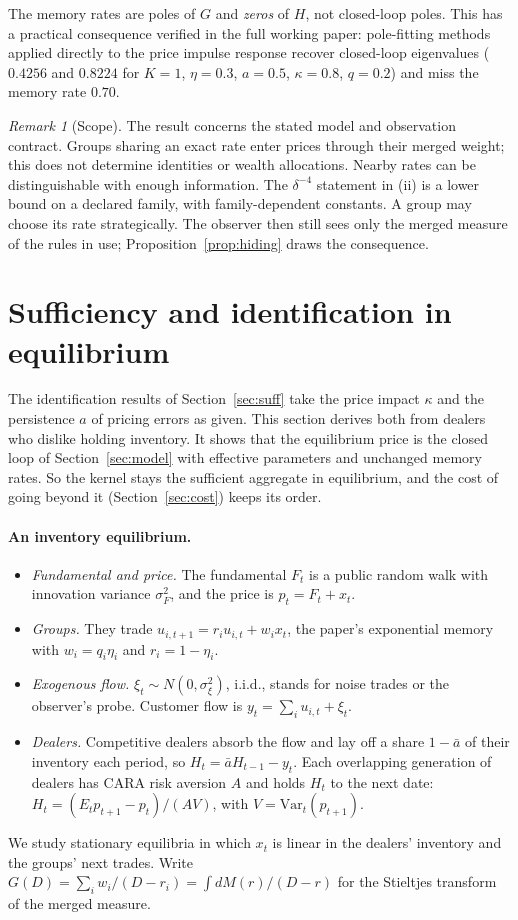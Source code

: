 \documentclass[12pt]{article}
\theoremstyle{definition}
\theoremstyle{remark}
\newtheorem{remark}[theorem]{Remark}
\begin{document}
The memory rates are poles of $G$ and \emph{zeros} of $H$, not closed-loop poles. This has a practical consequence verified in the full working paper: pole-fitting methods applied directly to the price impulse response recover closed-loop eigenvalues ($0.4256$ and $0.8224$ for $K=1$, $\eta=0.3$, $a=0.5$, $\kappa=0.8$, $q=0.2$) and miss the memory rate $0.70$.
\begin{remark}[Scope]\label{rem:scope}
The result concerns the stated model and observation contract. Groups sharing an exact rate enter prices through their merged weight; this does not determine identities or wealth allocations. Nearby rates can be distinguishable with enough information. The $\delta^{-4}$ statement in (ii) is a lower bound on a declared family, with family-dependent constants. A group may choose its rate strategically. The observer then still sees only the merged measure of the rules in use; Proposition~\ref{prop:hiding} draws the consequence.
\end{remark}
\section{Sufficiency and identification in equilibrium}\label{sec:equilibrium}

The identification results of Section~\ref{sec:suff} take the price impact $\kappa$ and the persistence $a$ of pricing errors as given. This section derives both from dealers who dislike holding inventory. It shows that the equilibrium price is the closed loop of Section~\ref{sec:model} with effective parameters and unchanged memory rates. So the kernel stays the sufficient aggregate in equilibrium, and the cost of going beyond it (Section~\ref{sec:cost}) keeps its order.


\paragraph{An inventory equilibrium.}
\begin{itemize}[itemsep=1pt,topsep=2pt]
\item \emph{Fundamental and price.} The fundamental $F_t$ is a public random walk with innovation variance $\sigma_F^2$, and the price is $p_t=F_t+x_t$.
\item \emph{Groups.} They trade $u_{i,t+1}=r_iu_{i,t}+w_ix_t$, the paper's exponential memory with $w_i=q_i\eta_i$ and $r_i=1-\eta_i$.
\item \emph{Exogenous flow.} $\xi_t\sim N(0,\sigma_\xi^2)$, i.i.d., stands for noise trades or the observer's probe. Customer flow is $y_t=\sum_iu_{i,t}+\xi_t$.
\item \emph{Dealers.} Competitive dealers absorb the flow and lay off a share $1-\bar a$ of their inventory each period, so $H_t=\bar aH_{t-1}-y_t$. Each overlapping generation of dealers has CARA risk aversion $A$ and holds $H_t$ to the next date: $H_t=(E_tp_{t+1}-p_t)/(AV)$, with $V=\mathrm{Var}_t(p_{t+1})$.
\end{itemize}
We study stationary equilibria in which $x_t$ is linear in the dealers' inventory and the groups' next trades. Write $G(D)=\sum_iw_i/(D-r_i)=\int dM(r)/(D-r)$ for the Stieltjes transform of the merged measure.
\end{document}
